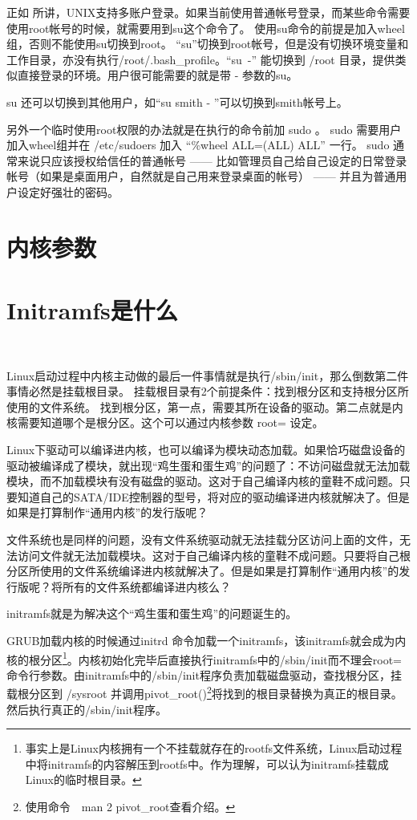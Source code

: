 正如  所讲，UNIX支持多账户登录。如果当前使用普通帐号登录，而某些命令需要使用root帐号的时候，就需要用到su这个命令了。
使用su命令的前提是加入wheel组，否则不能使用su切换到root。 “su”切换到root帐号，但是没有切换环境变量和工作目录，亦没有执行/root/.bash\_profile。{}“\hbox{su -}” 能切换到 /root 目录，提供类似直接登录的环境。用户很可能需要的就是带 - 参数的su。

su 还可以切换到其他用户，如“su smith - ”可以切换到smith帐号上。

另外一个临时使用root权限的办法就是在执行的命令前加 sudo 。 sudo 需要用户加入wheel组并在 /etc/sudoers 加入 “\%wheel ALL=(ALL) ALL” 一行。
sudo 通常来说只应该授权给信任的普通帐号 —— 比如管理员自己给自己设定的日常登录帐号（如果是桌面用户，自然就是自己用来登录桌面的帐号） —— 并且为普通用户设定好强壮的密码。

\section{内核参数}\label{FAQ：kernelparamter}


\section{Initramfs是什么}　\label{FAQ:initramfs}

Linux启动过程中内核主动做的最后一件事情就是执行/sbin/init，那么倒数第二件事情必然是挂载根目录。
挂载根目录有2个前提条件：找到根分区和支持根分区所使用的文件系统。
找到根分区，第一点，需要其所在设备的驱动。第二点就是内核需要知道哪个是根分区。这个可以通过内核参数 root= 设定。

Linux下驱动可以编译进内核，也可以编译为模块动态加载。如果恰巧磁盘设备的驱动被编译成了模块，就出现“鸡生蛋和蛋生鸡”的问题了：不访问磁盘就无法加载模块，而不加载模块有没有磁盘的驱动。这对于自己编译内核的童鞋不成问题。只要知道自己的SATA/IDE控制器的型号，将对应的驱动编译进内核就解决了。但是如果是打算制作“通用内核”的发行版呢？

文件系统也是同样的问题，没有文件系统驱动就无法挂载分区访问上面的文件，无法访问文件就无法加载模块。这对于自己编译内核的童鞋不成问题。只要将自己根分区所使用的文件系统编译进内核就解决了。但是如果是打算制作“通用内核”的发行版呢？将所有的文件系统都编译进内核么？

initramfs就是为解决这个“鸡生蛋和蛋生鸡”的问题诞生的。

GRUB加载内核的时候通过initrd 命令加载一个initramfs，该initramfs就会成为内核的根分区\footnote{事实上是Linux内核拥有一个不挂载就存在的rootfs文件系统，Linux启动过程中将initramfs的内容解压到rootfs中。作为理解，可以认为initramfs挂载成Linux的临时根目录。}。内核初始化完毕后直接执行initramfs中的/sbin/init而不理会root=命令行参数。由initramfs中的/sbin/init程序负责加载磁盘驱动，查找根分区，挂载根分区到 /sysroot 并调用pivot\_root()\footnote{使用命令　man 2 pivot\_root查看介绍。}将找到的根目录替换为真正的根目录。然后执行真正的/sbin/init程序。

